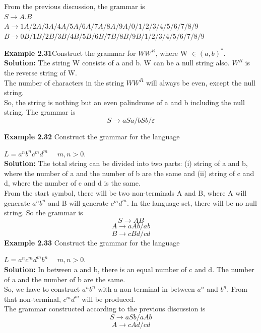 \documentclass[12pt]{book}
\begin{document}


	From the previous discussion, the grammar is
\\  	$ S \rightarrow A.B$
\\	  $ A \rightarrow 1A/2A/3A/4A/5A/6A/7A/8A/9A/0/1/2/3/4/5/6/7/8/9$
\\   $	B \rightarrow 0B/1B/2B/3B/4B/5B/6B/7B/8B/9B/1/2/3/4/5/6/7/8/9$


\textbf{\large Example 2.31}Construct the grammar for $WW^R$, where W $\in (a, b)^*$.\\



	\textbf{Solution:} The string W consists of a and b. W can be a null string also. $W^R$ is the reverse string
	of W. \\
	The number of characters in the string $WW^R$ will always be even, except the null string.\\
	So, the string is nothing but an even palindrome of a and b including the null string.
	The grammar is\\
	\[S \rightarrow aSa/bSb/\varepsilon\]
	
	
	
	
	\textbf{\large Example 2.32} Construct the grammar for the language
	
	 $L = a^nb^nc^md^m$ $\quad m, n > 0.$\\

    \textbf{Solution:} The total string can be divided into two parts: (i) string of a and b, where the number of
	a and 
	the number of b are the same and (ii) string of c and d, where the number of c and d is the
	same.\\
	From the start symbol, there will be two non-terminals A and B, where A will generate $a^nb^n$ and B 
	will generate $c^md^m$. In the language set, there will be no null string.
	So the grammar is\\
	\[S \rightarrow AB\]
	\[A \rightarrow aAb/ab\]
	\[B \rightarrow cBd/cd\]
	\textbf{\large Example 2.33} Construct the grammar for the language 
	
	$L = a^nc^md^mb^n$ $\quad m, n > 0.$\\
\textbf{Solution:} In between a and b, there is an equal number of c and d. The number of a and the
	number of 
	b are the same.\\
	So, we have to construct $a^nb^n$ with a non-terminal in between $a^n $ and $ b^n$. From that non-terminal, $c^md^m$
	will be produced.\\
	The grammar constructed according to the previous discussion is
	\[S \rightarrow aSb/aAb\]
	\[A \rightarrow cAd/cd\]      \\
	
\end{document}
